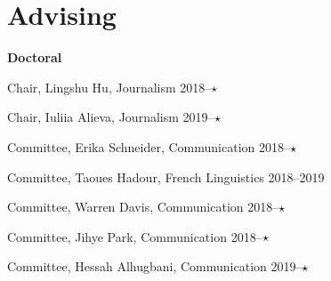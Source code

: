 
\section{Advising}

  \textbf{Doctoral}
    \begin{innerlist}
      \item Chair, Lingshu Hu, Journalism                                       \hfill 2018--$\star\hspace{1.5em}$
      \item Chair, Iuliia Alieva, Journalism                                    \hfill 2019--$\star\hspace{1.5em}$
      \item Committee, Erika Schneider, Communication                           \hfill 2018--$\star\hspace{1.5em}$
      \item Committee, Taoues Hadour, French Linguistics                        \hfill 2018--2019
      \item Committee, Warren Davis, Communication                              \hfill 2018--$\star\hspace{1.5em}$
      \item Committee, Jihye Park, Communication                                \hfill 2018--$\star\hspace{1.5em}$
      \item Committee, Hessah Alhugbani, Communication                          \hfill 2019--$\star\hspace{1.5em}$
    \end{innerlist}\vspace{1em}

